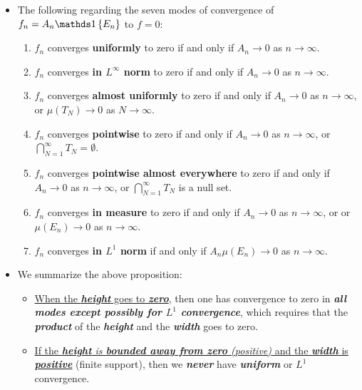 \documentclass[11pt]{article}
\begin{document}
\begin{itemize}
\item \begin{proposition}
The following regarding the seven modes of convergence of $f_{n}= A_n\ind{E_n}$ to $f=0$:
\begin{enumerate}
\item $f_n$ converges \textbf{uniformly} to zero if and only if $A_n \rightarrow 0$ as $n \rightarrow \infty$.
\item $f_n$ converges \textbf{in $L^\infty$ norm} to zero if and only if $A_n \rightarrow 0$ as $n \rightarrow \infty$.
\item $f_n$ converges \textbf{almost uniformly} to zero if and only if $A_n \rightarrow 0$ as $n \rightarrow \infty$, or $\mu(T_N ) \rightarrow 0$ as $N \rightarrow \infty$.
\item $f_n$ converges \textbf{pointwise} to zero if and only if $A_n \rightarrow 0$ as $n \rightarrow \infty$, or\, $\bigcap_{N=1}^{\infty}T_N  = \emptyset$.
\item $f_n$ converges \textbf{pointwise almost everywhere} to zero if and only if $A_n \rightarrow 0$ as $n \rightarrow \infty$, or $\bigcap_{N=1}^{\infty}T_N$ is a null set.
\item $f_n$ converges \textbf{in measure} to zero if and only if $A_n \rightarrow 0$ as $n \rightarrow \infty$, or or $\mu(E_n) \rightarrow 0$ as $n \rightarrow \infty$.
\item $f_n$ converges \textbf{in $L^1$ norm} if and only if $A_n\mu(E_n) \rightarrow 0$ as $n \rightarrow \infty$.
\end{enumerate}
\end{proposition}         

\item \begin{remark} We summarize the above proposition:
\begin{itemize}
\item \underline{When the \emph{\textbf{height}} goes to \emph{\textbf{zero}}},  then one has convergence to zero in \emph{\textbf{all modes except possibly for $L^1$ convergence}}, which requires that the \emph{\textbf{product}} of the \emph{\textbf{height}} and the \emph{\textbf{width}} goes to zero.

\item \underline{If the \emph{\textbf{height} is \textbf{bounded away from zero} (positive)} and the \emph{\textbf{width}} is \emph{\textbf{positive}}} (finite support), then we \emph{\textbf{never}} have \emph{\textbf{uniform}} or \emph{$L^1$} convergence.


\end{itemize}
\end{remark}
\end{itemize}
\end{document}
